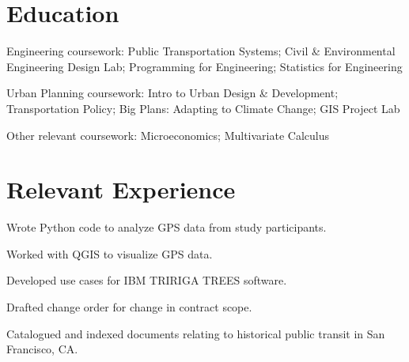 \documentclass[11pt]{article}
\begin{document}
\maketitle

\section{Education}
\def\employer{Massachusetts Institute of Technology}
\def\location{Cambridge, MA}
\def\title{Bachelor of Science Civil Engineering}
\def\dates{2014--May 2018}
\begin{position}
\item Engineering coursework: Public Transportation Systems; Civil \& Environmental Engineering Design Lab; Programming for Engineering; Statistics for Engineering
\item Urban Planning coursework: Intro to Urban Design \& Development; Transportation Policy; Big Plans: Adapting to Climate Change; GIS Project Lab
\item Other relevant coursework: Microeconomics; Multivariate Calculus
\end{position}

\section{Relevant Experience}
\def\employer{MIT Department of Economics}
\def\location{Cambridge, MA}
\def\title{Undergraduate Researcher}
\def\dates{August--September 2016}
\begin{position}
\item Wrote Python code to analyze GPS data from study participants.
\item Worked with QGIS to visualize GPS data.
\end{position}

\def\employer{San Francisco Bay Area Rapid Transit District (BART)}
\def\location{Oakland, CA}
\def\title{Intern}
\def\dates{July--August 2015}
\begin{position}
\item Developed use cases for IBM TRIRIGA TREES software.
\item Drafted change order for change in contract scope.
\end{position}

\def\employer{Market Street Railway}
\def\location{San Francisco, CA}
\def\title{Volunteer}
\def\dates{Summers 2012--2013}
\begin{position}
\item Catalogued and indexed documents relating to historical public transit in San Francisco, CA.
\end{position}
\end{document}
